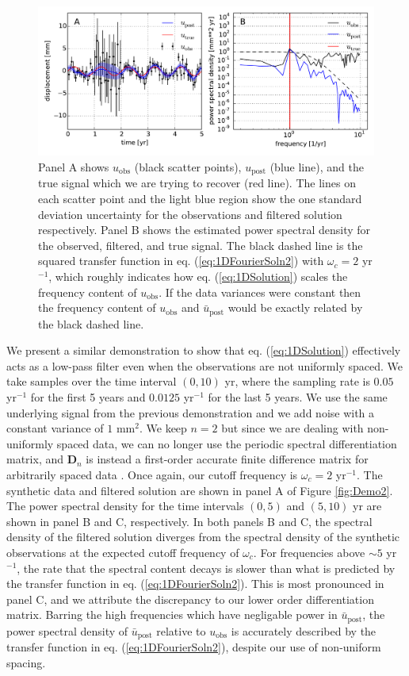 \documentclass[10pt,a4paper]{article}
\begin{document}
\begin{figure}
\includegraphics[scale=0.75]{figures/fig1}
\caption{Panel A shows $u_\mathrm{obs}$ (black scatter points), $u_\mathrm{post}$ (blue line), and the true signal which we are trying to recover (red line).  The lines on each scatter point and the light blue region show the one standard deviation uncertainty for the observations and filtered solution respectively. Panel B shows the estimated power spectral density for the observed, filtered, and true signal.  The black dashed line is the squared transfer function in eq. (\ref{eq:1DFourierSoln2}) with $\omega_c=2$ yr$^{-1}$, which roughly indicates how eq. (\ref{eq:1DSolution}) scales the frequency content of $u_\mathrm{obs}$.  If the data variances were constant then the frequency content of $u_\mathrm{obs}$ and $\bar{u}_\mathrm{post}$ would be exactly related by the black dashed line.}   
\label{fig:Demo1}
\end{figure}

We present a similar demonstration to show that eq. (\ref{eq:1DSolution}) effectively acts as a low-pass filter even when the observations are not uniformly spaced.  We take samples over the time interval $(0,10)$ yr, where the sampling rate is $0.05$ yr$^{-1}$ for the first 5 years and $0.0125$ yr$^{-1}$ for the last 5 years.  We use the same underlying signal from the previous demonstration and we add noise with a constant variance of $1$ mm$^2$.  We keep $n=2$ but since we are dealing with non-uniformly spaced data, we can no longer use the periodic spectral differentiation matrix, and $\mathbf{D}_n$ is instead a first-order accurate finite difference matrix for arbitrarily spaced data \citep{Fornberg1996}.  Once again, our cutoff frequency is $\omega_c = 2$ yr$^{-1}$.  The synthetic data and filtered solution are shown in panel A of Figure \ref{fig:Demo2}.  The power spectral density for the time intervals $(0,5)$ and $(5,10)$ yr are shown in panel B and C, respectively.  In both panels B and C, the spectral density of the filtered solution diverges from the spectral density of the synthetic observations at the expected cutoff frequency of $\omega_c$.  For frequencies above ${\sim}5$ yr$^{-1}$, the rate that the spectral content decays is slower than what is predicted by the transfer function in eq. (\ref{eq:1DFourierSoln2}). This is most pronounced in panel C, and we attribute the discrepancy to our lower order differentiation matrix. Barring the high frequencies which have negligable power in $\bar{u}_\mathrm{post}$, the power spectral density of $\bar{u}_\mathrm{post}$ relative to $u_\mathrm{obs}$ is accurately described by the transfer function in eq. (\ref{eq:1DFourierSoln2}), despite our use of non-uniform spacing.
\end{document}
